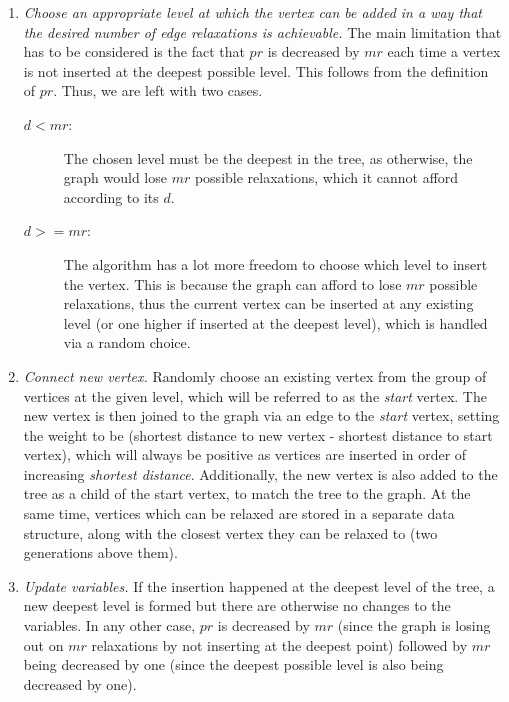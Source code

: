 \documentclass{l4proj}
\begin{document}
\begin{enumerate}[I]
	\item
	\emph{Choose an appropriate level at which the vertex can be added in a way that the desired number of edge relaxations is achievable.} The main limitation that has to be considered is the fact that $pr$ is decreased by $mr$ each time a vertex is not inserted at the deepest possible level. This follows from the definition of $pr$. Thus, we are left with two cases.

	\begin{description}
		\item[$d < mr$:]
		The chosen level must be the deepest in the tree, as otherwise, the graph would lose $mr$ possible relaxations, which it cannot afford according to its $d$. 
		\item[$d >= mr$:]
		The algorithm has a lot more freedom to choose which level to insert the vertex. This is because the graph can afford to lose $mr$ possible relaxations, thus the current vertex can be inserted at any existing level (or one higher if inserted at the deepest level), which is handled via a random choice.
	\end{description} 

	\item
	\emph{Connect new vertex.} Randomly choose an existing vertex from the group of vertices at the given level, which will be referred to as the \emph{start} vertex. The new vertex is then joined to the graph via an edge to the \emph{start} vertex, setting the weight to be (shortest distance to new vertex - shortest distance to start vertex), which will always be positive as vertices are inserted in order of increasing \emph{shortest distance}.  Additionally, the new vertex is also added to the tree as a child of the start vertex, to match the tree to the graph. At the same time, vertices which can be relaxed are stored in a separate data structure, along with the closest vertex they can be relaxed to (two generations above them).

	\item
	\emph{Update variables.} If the insertion happened at the deepest level of the tree, a new deepest level is formed but there are otherwise no changes to the variables. In any other case, $pr$ is decreased by $mr$ (since the graph is losing out on $mr$ relaxations by not inserting at the deepest point) followed by $mr$ being decreased by one (since the deepest possible level is also being decreased by one). 
\end{enumerate}
\end{document}
